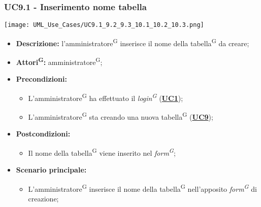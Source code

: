 \subsubsection{UC9.1 - Inserimento nome tabella}
\label{sec:UC9.1}
\texttt{[image: UML\_Use\_Cases/UC9.1\_9.2\_9.3\_10.1\_10.2\_10.3.png]}
\begin{itemize}
	\item \textbf{Descrizione:} l’amministratore\textsuperscript{G} inserisce il nome della tabella\textsuperscript{G} da creare;
	\item \textbf{Attori\textsuperscript{G}:} amministratore\textsuperscript{G};
	\item \textbf{Precondizioni:} 
	\begin{itemize}
		\item L’amministratore\textsuperscript{G} ha effettuato il \textit{login\textsuperscript{G}} (\hyperref[sec:UC1]{\textbf{UC1}});
		\item L’amministratore\textsuperscript{G} sta creando una nuova tabella\textsuperscript{G} (\hyperref[sec:UC9]{\textbf{UC9}});
	\end{itemize}
	\item \textbf{Postcondizioni:} 
	\begin{itemize}
		\item Il nome della tabella\textsuperscript{G} viene inserito nel \textit{form\textsuperscript{G}};
	\end{itemize}
	\item \textbf{Scenario principale:} 
	\begin{itemize}
		\item L’amministratore\textsuperscript{G} inserisce il nome della tabella\textsuperscript{G} nell'apposito \textit{form\textsuperscript{G}} di creazione;
	\end{itemize}
\end{itemize}

